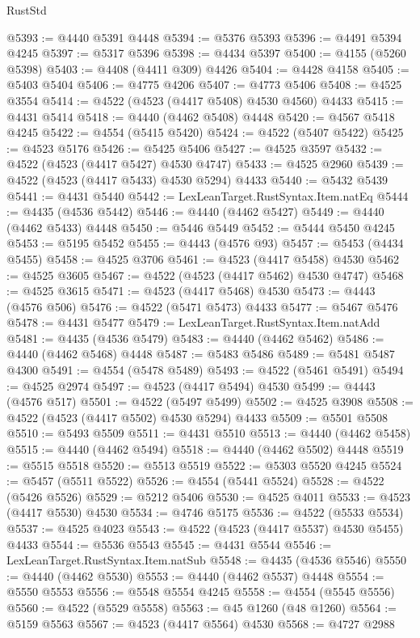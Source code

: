 \begin{lexlean}{RustStd}
\begin{coremodule}
@5393 := @4440 @5391 @4448
@5394 := @5376 @5393
@5396 := @4491 @5394 @4245
@5397 := @5317 @5396
@5398 := @4434 @5397
@5400 := @4155 (@5260 @5398)
@5403 := @4408 (@4411 @309) @4426
@5404 := @4428 @4158
@5405 := @5403 @5404
@5406 := @4775 @4206
@5407 := @4773 @5406
@5408 := @4525 @3554
@5414 := @4522 (@4523 (@4417 @5408) @4530 @4560) @4433
@5415 := @4431 @5414
@5418 := @4440 (@4462 @5408) @4448
@5420 := @4567 @5418 @4245
@5422 := @4554 (@5415 @5420)
@5424 := @4522 (@5407 @5422)
@5425 := @4523 @5176
@5426 := @5425 @5406
@5427 := @4525 @3597
@5432 := @4522 (@4523 (@4417 @5427) @4530 @4747)
@5433 := @4525 @2960
@5439 := @4522 (@4523 (@4417 @5433) @4530 @5294) @4433
@5440 := @5432 @5439
@5441 := @4431 @5440
@5442 := LexLeanTarget.RustSyntax.Item.natEq
@5444 := @4435 (@4536 @5442)
@5446 := @4440 (@4462 @5427)
@5449 := @4440 (@4462 @5433) @4448
@5450 := @5446 @5449
@5452 := @5444 @5450 @4245
@5453 := @5195 @5452
@5455 := @4443 (@4576 @93)
@5457 := @5453 (@4434 @5455)
@5458 := @4525 @3706
@5461 := @4523 (@4417 @5458) @4530
@5462 := @4525 @3605
@5467 := @4522 (@4523 (@4417 @5462) @4530 @4747)
@5468 := @4525 @3615
@5471 := @4523 (@4417 @5468) @4530
@5473 := @4443 (@4576 @506)
@5476 := @4522 (@5471 @5473) @4433
@5477 := @5467 @5476
@5478 := @4431 @5477
@5479 := LexLeanTarget.RustSyntax.Item.natAdd
@5481 := @4435 (@4536 @5479)
@5483 := @4440 (@4462 @5462)
@5486 := @4440 (@4462 @5468) @4448
@5487 := @5483 @5486
@5489 := @5481 @5487 @4300
@5491 := @4554 (@5478 @5489)
@5493 := @4522 (@5461 @5491)
@5494 := @4525 @2974
@5497 := @4523 (@4417 @5494) @4530
@5499 := @4443 (@4576 @517)
@5501 := @4522 (@5497 @5499)
@5502 := @4525 @3908
@5508 := @4522 (@4523 (@4417 @5502) @4530 @5294) @4433
@5509 := @5501 @5508
@5510 := @5493 @5509
@5511 := @4431 @5510
@5513 := @4440 (@4462 @5458)
@5515 := @4440 (@4462 @5494)
@5518 := @4440 (@4462 @5502) @4448
@5519 := @5515 @5518
@5520 := @5513 @5519
@5522 := @5303 @5520 @4245
@5524 := @5457 (@5511 @5522)
@5526 := @4554 (@5441 @5524)
@5528 := @4522 (@5426 @5526)
@5529 := @5212 @5406
@5530 := @4525 @4011
@5533 := @4523 (@4417 @5530) @4530
@5534 := @4746 @5175
@5536 := @4522 (@5533 @5534)
@5537 := @4525 @4023
@5543 := @4522 (@4523 (@4417 @5537) @4530 @5455) @4433
@5544 := @5536 @5543
@5545 := @4431 @5544
@5546 := LexLeanTarget.RustSyntax.Item.natSub
@5548 := @4435 (@4536 @5546)
@5550 := @4440 (@4462 @5530)
@5553 := @4440 (@4462 @5537) @4448
@5554 := @5550 @5553
@5556 := @5548 @5554 @4245
@5558 := @4554 (@5545 @5556)
@5560 := @4522 (@5529 @5558)
@5563 := @45 @1260 (@48 @1260)
@5564 := @5159 @5563
@5567 := @4523 (@4417 @5564) @4530
@5568 := @4727 @2988

\end{coremodule}
\end{lexlean}
